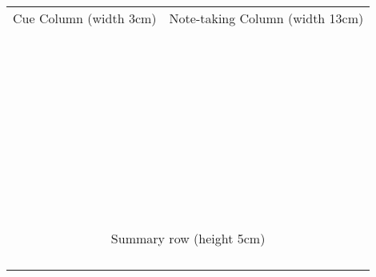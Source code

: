 \begin{tabular}{|p{3cm}||p{13cm}|}
\hline
    Cue Column (width 3cm) & Note-taking Column (width 13cm) \\
    &\\
    &\\
    &\\
    &\\
    &\\
    &\\
    &\\
    &\\
    &\\
    &\\
    &\\
    &\\
    &\\
    &\\
    &\\
    &\\
    &\\
    &\\
    &\\
    &\\
    &\\
    &\\
    &\\
    &\\
    &\\
    &\\
    &\\
    &\\
    &\\
    &\\
    &\\
    &\\
    &\\
    &\\
    &\\
    &\\
    &\\
    &\\
    &\\
    &\\
    &\\
    \hline \hline
    \multicolumn{2}{|c|}{Summary row (height 5cm)} \\
    \multicolumn{2}{|c|}{} \\
    \multicolumn{2}{|c|}{} \\
    \multicolumn{2}{|c|}{} \\
    \multicolumn{2}{|c|}{} \\
    \hline
\end{tabular}


